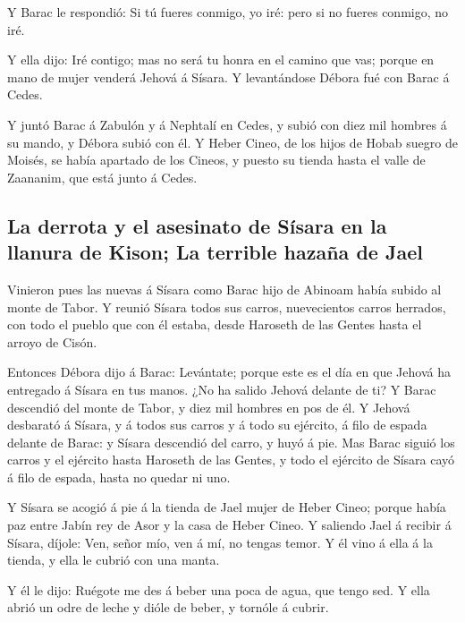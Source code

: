  Y Barac le respondió: Si tú fueres conmigo, yo iré: pero si
no fueres conmigo, no iré.

 Y ella dijo: Iré contigo; mas no será tu honra en el camino
que vas; porque en mano de mujer venderá Jehová á Sísara. Y levantándose
Débora fué con Barac á Cedes.

 Y juntó Barac á Zabulón y á Nephtalí en Cedes, y subió con
diez mil hombres á su mando, y Débora subió con él.  Y
Heber Cineo, de los hijos de Hobab suegro de Moisés, se había apartado
de los Cineos, y puesto su tienda hasta el valle de Zaananim, que está
junto á Cedes.

\hypertarget{la-derrota-y-el-asesinato-de-suxedsara-en-la-llanura-de-kison-la-terrible-hazauxf1a-de-jael}{%
\subsection{La derrota y el asesinato de Sísara en la llanura de Kison;
La terrible hazaña de
Jael}\label{la-derrota-y-el-asesinato-de-suxedsara-en-la-llanura-de-kison-la-terrible-hazauxf1a-de-jael}}

 Vinieron pues las nuevas á Sísara como Barac hijo de
Abinoam había subido al monte de Tabor.  Y reunió Sísara
todos sus carros, nuevecientos carros herrados, con todo el pueblo que
con él estaba, desde Haroseth de las Gentes hasta el arroyo de Cisón.

 Entonces Débora dijo á Barac: Levántate; porque este es el
día en que Jehová ha entregado á Sísara en tus manos. ¿No ha salido
Jehová delante de ti? Y Barac descendió del monte de Tabor, y diez mil
hombres en pos de él.  Y Jehová desbarató á Sísara, y á
todos sus carros y á todo su ejército, á filo de espada delante de
Barac: y Sísara descendió del carro, y huyó á pie.  Mas
Barac siguió los carros y el ejército hasta Haroseth de las Gentes, y
todo el ejército de Sísara cayó á filo de espada, hasta no quedar ni
uno.

 Y Sísara se acogió á pie á la tienda de Jael mujer de
Heber Cineo; porque había paz entre Jabín rey de Asor y la casa de Heber
Cineo.  Y saliendo Jael á recibir á Sísara, díjole: Ven,
señor mío, ven á mí, no tengas temor. Y él vino á ella á la tienda, y
ella le cubrió con una manta.

 Y él le dijo: Ruégote me des á beber una poca de agua, que
tengo sed. Y ella abrió un odre de leche y dióle de beber, y tornóle á
cubrir.

